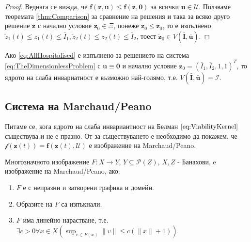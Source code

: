 \begin{proof}
  Веднага се вижда, че $\mathbf{f}(\mathbf{z}, \mathbf{u}) \leq \mathbf{f}(\mathbf{z}, \mathbf{0})$ за всички $\mathbf{u} \in \mathscr{U}$.
  Ползваме теоремата \eqref{thm:Comparison} за сравнение на решения и така за всяко друго решение $\tilde{\mathbf{z}}$ с начално условие $\tilde{\mathbf{z}}_0 \in \Xi$, понеже $\tilde{\mathbf{z}}_0 \leq \mathbf{z}_0$, то е изпълнено $\tilde{z}_1(t) \leq z_1(t) \leq \bar{I}_1, \tilde{z}_2(t) \leq z_2(t) \leq \bar{I}_2$, тоест $\tilde{\mathbf{z}}_0 \in V(\bar{\mathbf{I}}, \bar{\mathbf{u}})$.
\end{proof}

\begin{corollary}
  Ако \eqref{eq:AllHospitalised} е изпълнено за решението на система \eqref{eq:TheDimensionlessProblem} с $\mathbf{u} \equiv \mathbf{0}$ и начално условие $\mathbf{z}_0 = (\bar{I}_1, \bar{I}_2, 1, 1)^T$, то ядрото на слаба инвариатност е възможно най-голямо, т.е. $V(\bar{\mathbf{I}}, \bar{\mathbf{u}}) = \mathscr{I}$.
\end{corollary}

\subsection{Система на Marchaud/Peano}
Питаме се, кога ядрото на слаба инвариантност на Белман $\eqref{eq:ViabilityKernel}$ съществува и не е празно. От \cite{Aubin2011} за съществуването е необходимо да покажем, че $\mathscr{f}(\mathbf{z}(t))=\mathbf{f}(\mathbf{z}(t), \mathscr{U})$ е изображение на Marchaud/Peano.



\begin{definition}
  Многозначното изображение $F:X \rightarrow Y$, $Y \subseteq \mathscr{P}(Z)$, $X, Z$ - Банахови, e изображение на Marchaud/Peano, ако:
  \begin{enumerate}
    \item $F$ е с непразни и затворени графика и домейн.
    \item Образите на $F$ са изпъкнали.
    \item $F$ има линейно нарастване, т.е. $\exists{c>0}\forall{x \in X}(\sup_{v \in F(x)} \|v\| \leq c(\|x\|+1))$
  \end{enumerate}
\end{definition}

